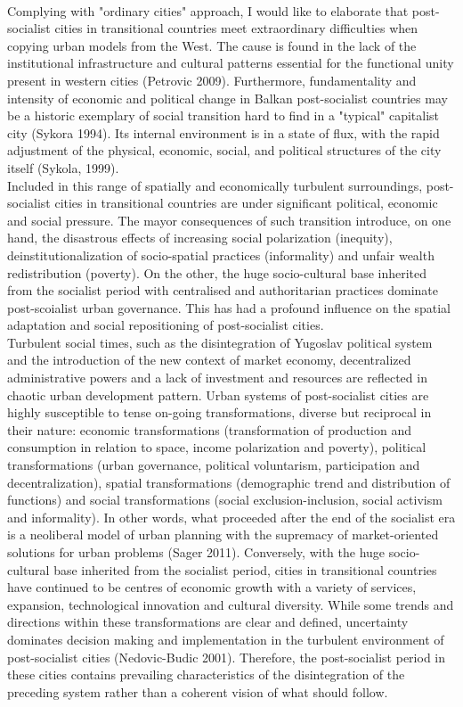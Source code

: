 \documentclass[11pt]{report}
\begin{document}
\\
Complying with "ordinary cities" approach, I would like to elaborate that post-socialist cities in transitional countries meet extraordinary difficulties when copying urban models from the West.  The cause is found in the lack of the institutional infrastructure and cultural patterns essential for the functional unity present in western cities (Petrovic 2009). Furthermore, fundamentality and intensity of economic and political change in Balkan post-socialist countries may be a historic exemplary of social transition hard to find in a "typical" capitalist city (Sykora 1994). Its internal environment is in a state of flux, with the rapid adjustment of the physical, economic, social, and political structures of the city itself (Sykola, 1999).
\\
Included in this range of spatially and economically turbulent surroundings, post-socialist cities in transitional countries are under significant political, economic and social pressure. The mayor consequences of such transition introduce, on one hand, the disastrous effects of increasing social polarization (inequity), deinstitutionalization of socio-spatial practices (informality) and unfair wealth redistribution (poverty). On the other, the huge socio-cultural base inherited from the socialist period with centralised and authoritarian practices dominate post-scoialist urban governance. This has had a profound influence on the spatial adaptation and social repositioning of post-socialist cities.
\\
Turbulent social times, such as the disintegration of Yugoslav political system and the introduction of the new context of market economy, decentralized administrative powers and a lack of investment and resources are reflected in chaotic urban development pattern. Urban systems of post-socialist cities are highly susceptible to tense on-going transformations, diverse but reciprocal in their nature: economic transformations (transformation of production and consumption in relation to space, income polarization and poverty), political transformations (urban governance, political voluntarism, participation and decentralization), spatial transformations (demographic trend and distribution of functions) and social transformations (social exclusion-inclusion, social activism and informality). In other words, what proceeded after the end of the socialist era is a neoliberal model of urban planning with the supremacy of market-oriented solutions for urban problems (Sager 2011). Conversely, with the huge socio-cultural base inherited from the socialist period, cities in transitional countries have continued to be centres of economic growth with a variety of services, expansion, technological innovation and cultural diversity. While some trends and directions within these transformations are clear and defined, uncertainty dominates decision making and implementation in the turbulent environment of post-socialist cities (Nedovic-Budic 2001). Therefore, the post-socialist period in these cities contains prevailing characteristics of the disintegration of the preceding system rather than a coherent vision of what should follow. 
\end{document}
